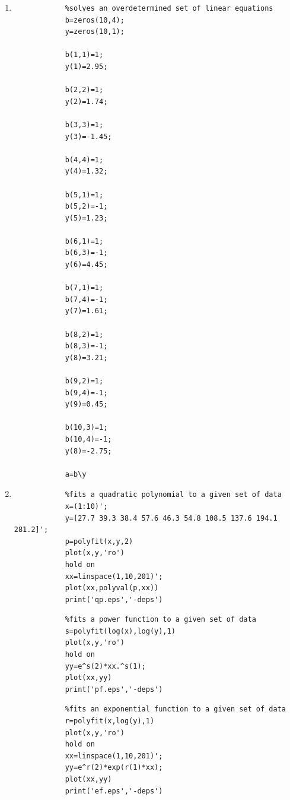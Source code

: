\documentclass[11pt,a4paper]{article}
\begin{document}
\begin{enumerate}
\begin{verbatim}
			%computes and plots the pchip interpolants and
			%their first, second and third derivatives
			pp=interp1(xx,yy,'pchip','pp');
			subplot(2,2,1)
			plot(x,ppval(pp,x))
			hold on
			plot(xx,yy,'ro')
			title('Pchip')
			pp1=ppderiv(pp);
			subplot(2,2,2)
			plot(x,ppval(pp1,x))
			title('First derivative')
			pp2=ppderiv(pp1);
			subplot(2,2,3)
			plot(x,ppval(pp2,x))
			xlabel('Second derivative')
			pp3=ppderiv(pp2);
			subplot(2,2,4)
			plot(x,ppval(pp3,x))
			xlabel('Third derivative')
			print('q3pc.eps','-deps')
		\end{verbatim}
	
	\item
		\begin{verbatim}
			%solves an overdetermined set of linear equations
			b=zeros(10,4);
			y=zeros(10,1);

			b(1,1)=1;
			y(1)=2.95;
			
			b(2,2)=1;
			y(2)=1.74;

			b(3,3)=1;
			y(3)=-1.45;

			b(4,4)=1;
			y(4)=1.32;

			b(5,1)=1;
			b(5,2)=-1;
			y(5)=1.23;

			b(6,1)=1;
			b(6,3)=-1;
			y(6)=4.45;

			b(7,1)=1;
			b(7,4)=-1;
			y(7)=1.61;

			b(8,2)=1;
			b(8,3)=-1;
			y(8)=3.21;

			b(9,2)=1;
			b(9,4)=-1;
			y(9)=0.45;

			b(10,3)=1;
			b(10,4)=-1;
			y(8)=-2.75;
			
			a=b\y
		\end{verbatim}

	\item
		\begin{verbatim}
			%fits a quadratic polynomial to a given set of data
			x=(1:10)';
			y=[27.7 39.3 38.4 57.6 46.3 54.8 108.5 137.6 194.1 281.2]';
			p=polyfit(x,y,2)
			plot(x,y,'ro')
			hold on
			xx=linspace(1,10,201)';
			plot(xx,polyval(p,xx))
			print('qp.eps','-deps')
		\end{verbatim}
		
		\begin{verbatim}
			%fits a power function to a given set of data
			s=polyfit(log(x),log(y),1)
			plot(x,y,'ro')
			hold on
			yy=e^s(2)*xx.^s(1);
			plot(xx,yy)
			print('pf.eps','-deps')
		\end{verbatim}
		
		\begin{verbatim}
			%fits an exponential function to a given set of data
			r=polyfit(x,log(y),1)
			plot(x,y,'ro')
			hold on
			xx=linspace(1,10,201)';
			yy=e^r(2)*exp(r(1)*xx);
			plot(xx,yy)
			print('ef.eps','-deps')
		\end{verbatim}
	

\end{enumerate}
\end{document}
